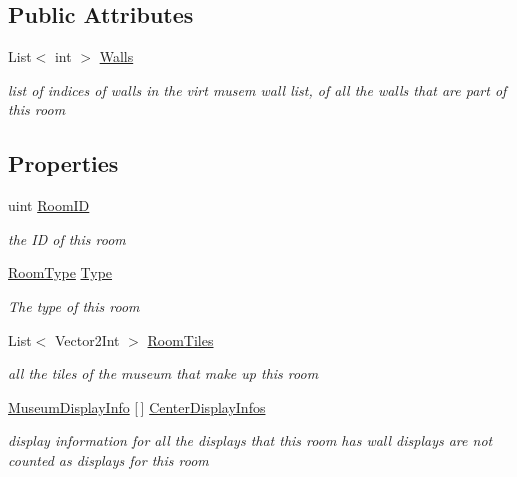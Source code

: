\subsection*{Public Attributes}
\begin{DoxyCompactItemize}
\item 
List$<$ int $>$ \mbox{\hyperlink{class_room_a22669d53756bbfecb106f4f6c9529bb9}{Walls}}
\begin{DoxyCompactList}\small\item\em list of indices of walls in the virt musem wall list, of all the walls that are part of this room \end{DoxyCompactList}\end{DoxyCompactItemize}
\subsection*{Properties}
\begin{DoxyCompactItemize}
\item 
uint \mbox{\hyperlink{class_room_a499df97242b8996b66cc22737159f59c}{Room\+ID}}
\begin{DoxyCompactList}\small\item\em the ID of this room \end{DoxyCompactList}\item 
\mbox{\hyperlink{_room_8cs_ab540f7414f306325d92272bcef1e34e1}{Room\+Type}} \mbox{\hyperlink{class_room_a55dc5c580ea31562a0aa6f11b4b8f462}{Type}}
\begin{DoxyCompactList}\small\item\em The type of this room \end{DoxyCompactList}\item 
List$<$ Vector2\+Int $>$ \mbox{\hyperlink{class_room_aed67349f7f161cb2214111eff3e51018}{Room\+Tiles}}
\begin{DoxyCompactList}\small\item\em all the tiles of the museum that make up this room \end{DoxyCompactList}\item 
\mbox{\hyperlink{class_museum_display_info}{Museum\+Display\+Info}} \mbox{[}$\,$\mbox{]} \mbox{\hyperlink{class_room_ab7a1da4fa70bf843d643391bdbaa1fb5}{Center\+Display\+Infos}}
\begin{DoxyCompactList}\small\item\em display information for all the displays that this room has wall displays are not counted as displays for this room \end{DoxyCompactList}\end{DoxyCompactItemize}
